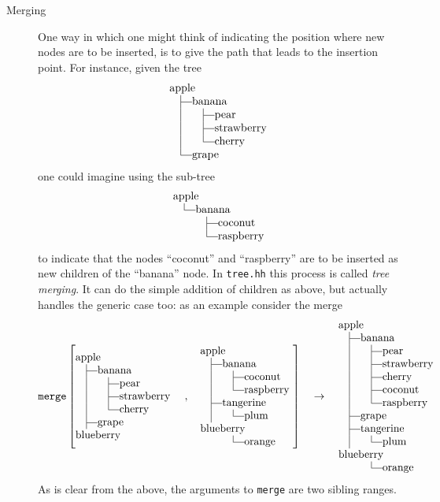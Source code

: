 \documentclass[11pt]{kasper}
\newcommand{\member}[1]{{\tt #1}\index{#1}}
\def\mystrut{\vbox to 8.5pt{}\vtop to 3.5pt{}}
\def\V{\hskip10pt\vrule\hskip10pt}
\def\T{\hskip10pt\vrule\vrule height2.5pt depth -2.1pt width 10pt}
\def\L{\hskip10pt\vrule height 8.5pt depth -2.1pt
       \vrule height2.5pt depth -2.1pt width 10pt}
\def\N{\hskip10pt\phantom{\vrule}\hskip10pt}
\def\hw{\hskip-1000pt plus 1fil}
\begin{document}
\begin{sectionunit}
\begin{sectionunit}
\begin{description}
\item[Merging] One way in which one might think of indicating the
position where new nodes are to be inserted, is to give the path that
leads to the insertion point.  For instance, given the tree
\begin{equation*}
\vcenter{\offinterlineskip
\halign{&#\mystrut\hfil\cr
 apple \hw\cr
 \T banana\cr
 \V   \T  pear \cr
 \V   \T  strawberry \cr
 \V   \L  cherry \cr
 \L grape\cr}}
\end{equation*}
one could imagine using the sub-tree
\begin{equation*}
\vcenter{\offinterlineskip
\halign{&#\mystrut\hfil\cr
 apple \hw\cr
 \L banana\cr
 \N   \T  coconut \cr
 \N   \L  raspberry \cr}}
\end{equation*}
to indicate that the nodes ``coconut'' and ``raspberry'' are to be
inserted as new children of the ``banana'' node. In {\tt tree.hh} this
process is called \emph{tree merging}. It can do the simple addition
of children as above, but actually handles the generic case too: as
an example consider the merge
\begin{equation*}
\text{\tt merge}\left[
\vcenter{\offinterlineskip
\halign{&#\mystrut\hfil\cr
 apple \hw\cr
 \T banana\cr
 \V   \T  pear \cr
 \V   \T  strawberry \cr
 \V   \L  cherry \cr
 \T grape\cr
 blueberry \cr}}\quad, \quad
\vcenter{\offinterlineskip
\halign{&#\mystrut\hfil\cr
 apple \hw\cr
 \T banana\cr
 \V   \T coconut \cr
 \V   \L raspberry \cr
 \T tangerine \cr
 \V   \L plum\cr
 blueberry \cr
 \N   \L orange \cr}}\right]\quad\rightarrow\quad
\vcenter{\offinterlineskip
\halign{&#\mystrut\hfil\cr
 apple \hw\cr
 \T banana\cr
 \V   \T pear\cr
 \V   \T strawberry\cr
 \V   \T cherry\cr
 \V   \T coconut \cr
 \V   \L raspberry \cr
 \T grape\cr
 \T tangerine \cr
 \V   \L plum\cr
 blueberry \cr
 \N  \L orange \cr}}
\end{equation*}
As is clear from the above, the arguments to \member{merge} are two
sibling ranges.
\end{description}
\end{sectionunit}
\end{sectionunit}

\printindex
\end{document}
